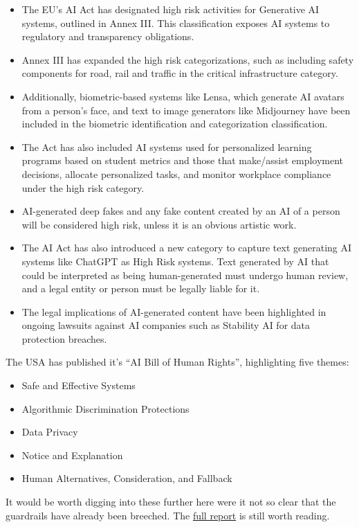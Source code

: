 \begin{itemize}
\item The EU's AI Act has designated high risk activities for Generative AI systems, outlined in Annex III. This classification exposes AI systems to regulatory and transparency obligations.
\item Annex III has expanded the high risk categorizations, such as including safety components for road, rail and traffic in the critical infrastructure category.
\item Additionally, biometric-based systems like Lensa, which generate AI avatars from a person's face, and text to image generators like Midjourney have been included in the biometric identification and categorization classification.
\item The Act has also included AI systems used for personalized learning programs based on student metrics and those that make/assist employment decisions, allocate personalized tasks, and monitor workplace compliance under the high risk category.
\item AI-generated deep fakes and any fake content created by an AI of a person will be considered high risk, unless it is an obvious artistic work.
\item The AI Act has also introduced a new category to capture text generating AI systems like ChatGPT as High Risk systems. Text generated by AI that could be interpreted as being human-generated must undergo human review, and a legal entity or person must be legally liable for it.
\item The legal implications of AI-generated content have been highlighted in ongoing lawsuits against AI companies such as Stability AI for data protection breaches.
\end{itemize}
The USA has published it's ``AI Bill of Human Rights'', highlighting five themes:
\begin{itemize}
\item Safe and Effective Systems
\item Algorithmic Discrimination Protections
\item Data Privacy
\item Notice and Explanation
\item Human Alternatives, Consideration, and Fallback
\end{itemize}
It would be worth digging into these further here were it not so clear that the guardrails have already been breeched. The \href{https://www.whitehouse.gov/wp-content/uploads/2022/10/Blueprint-for-an-AI-Bill-of-Rights.pdf}{full report} is still worth reading.\par 
